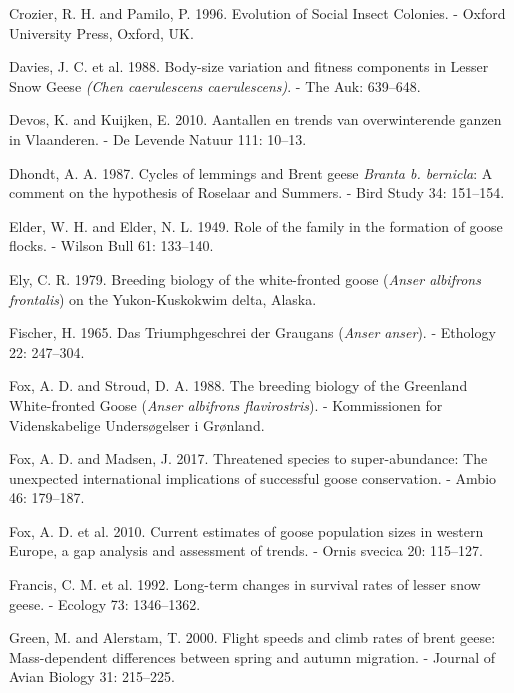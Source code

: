 \documentclass[10pt,twocolumn]{paper}
\begin{document}
\hypertarget{ref-crozier1996evolution}{}
Crozier, R. H. and Pamilo, P. 1996. Evolution of Social Insect Colonies.
- Oxford University Press, Oxford, UK.

\hypertarget{ref-davies1988body}{}
Davies, J. C. et al. 1988. Body-size variation and fitness components in
Lesser Snow Geese \emph{(Chen caerulescens caerulescens)}. - The Auk:
639--648.

\hypertarget{ref-devos2010aantallen}{}
Devos, K. and Kuijken, E. 2010. Aantallen en trends van overwinterende
ganzen in Vlaanderen. - De Levende Natuur 111: 10--13.

\hypertarget{ref-dhondt1987cycles}{}
Dhondt, A. A. 1987. Cycles of lemmings and Brent geese \emph{Branta b.
bernicla}: A comment on the hypothesis of Roselaar and Summers. - Bird
Study 34: 151--154.

\hypertarget{ref-elder1949role}{}
Elder, W. H. and Elder, N. L. 1949. Role of the family in the formation
of goose flocks. - Wilson Bull 61: 133--140.

\hypertarget{ref-ely1979breeding}{}
Ely, C. R. 1979. Breeding biology of the white-fronted goose
(\emph{Anser albifrons frontalis}) on the Yukon-Kuskokwim delta, Alaska.

\hypertarget{ref-fischer1965triumphgeschrei}{}
Fischer, H. 1965. Das Triumphgeschrei der Graugans (\emph{Anser anser}).
- Ethology 22: 247--304.

\hypertarget{ref-fox1988breeding}{}
Fox, A. D. and Stroud, D. A. 1988. The breeding biology of the Greenland
White-fronted Goose (\emph{Anser albifrons flavirostris}). -
Kommissionen for Videnskabelige Undersøgelser i Grønland.

\hypertarget{ref-Fox2017a}{}
Fox, A. D. and Madsen, J. 2017. Threatened species to super-abundance:
The unexpected international implications of successful goose
conservation. - Ambio 46: 179--187.

\hypertarget{ref-fox2010current}{}
Fox, A. D. et al. 2010. Current estimates of goose population sizes in
western Europe, a gap analysis and assessment of trends. - Ornis svecica
20: 115--127.

\hypertarget{ref-francis1992survival}{}
Francis, C. M. et al. 1992. Long-term changes in survival rates of
lesser snow geese. - Ecology 73: 1346--1362.

\hypertarget{ref-JAV:JAV310213}{}
Green, M. and Alerstam, T. 2000. Flight speeds and climb rates of brent
geese: Mass-dependent differences between spring and autumn migration. -
Journal of Avian Biology 31: 215--225.
\end{document}
